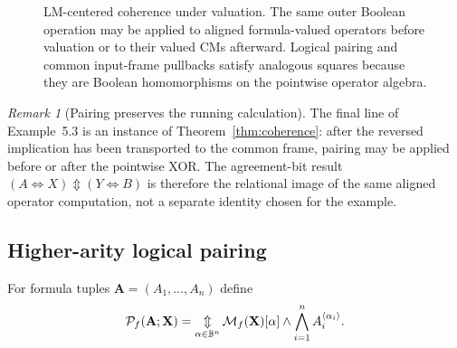 \documentclass[11pt]{article}
\theoremstyle{definition}
\theoremstyle{remark}
\newtheorem{remark}[theorem]{Remark}
\newcommand{\B}{\mathbb B}
\newcommand{\cM}{\mathcal M}
\newcommand{\cP}{\mathcal P}
\newcommand{\xor}{\mathbin{\Updownarrow}}
\newcommand{\bigxor}{\mathop{\Updownarrow}\displaylimits}
\begin{document}
\begin{figure}[ht]
\centering
{}
\caption{LM-centered coherence under valuation.  The same outer Boolean operation may be applied to aligned formula-valued operators before valuation or to their valued CMs afterward.  Logical pairing and common input-frame pullbacks satisfy analogous squares because they are Boolean homomorphisms on the pointwise operator algebra.}
\label{fig:coherencesquare}
\end{figure}

\begin{remark}[Pairing preserves the running calculation]
The final line of Example~5.3 is an instance of Theorem~\ref{thm:coherence}: after the reversed implication has been transported to the common frame, pairing may be applied before or after the pointwise XOR.  The agreement-bit result $(A\Leftrightarrow X)\xor(Y\Leftrightarrow B)$ is therefore the relational image of the same aligned operator computation, not a separate identity chosen for the example.
\end{remark}

\subsection{Higher-arity logical pairing}
For formula tuples $\mathbf A=(A_1,\ldots,A_n)$ define
\begin{equation}
 \cP_f(\mathbf A;\mathbf X)
 =\bigxor_{\alpha\in\B^n}
 \cM_f(\mathbf X)[\alpha]
 \land\bigwedge_{i=1}^n A_i^{\langle\alpha_i\rangle}.
 \label{eq:npairingdef}
\end{equation}
\end{document}

